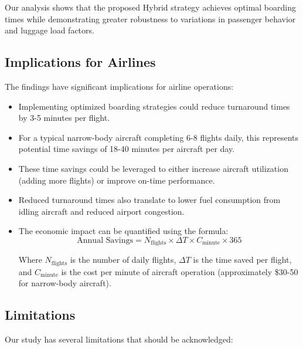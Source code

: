 \documentclass[12pt]{article}
\begin{document}
Our analysis shows that the proposed Hybrid strategy achieves optimal boarding times while demonstrating greater robustness to variations in passenger behavior and luggage load factors.

\subsection{Implications for Airlines}

The findings have significant implications for airline operations:

\begin{itemize}
    \item Implementing optimized boarding strategies could reduce turnaround times by 3-5 minutes per flight.
    
    \item For a typical narrow-body aircraft completing 6-8 flights daily, this represents potential time savings of 18-40 minutes per aircraft per day.
    
    \item These time savings could be leveraged to either increase aircraft utilization (adding more flights) or improve on-time performance.
    
    \item Reduced turnaround times also translate to lower fuel consumption from idling aircraft and reduced airport congestion.
    
    \item The economic impact can be quantified using the formula:
    \begin{equation}
        \text{Annual Savings} = N_{\text{flights}} \times \Delta T \times C_{\text{minute}} \times 365
    \end{equation}
    
    Where $N_{\text{flights}}$ is the number of daily flights, $\Delta T$ is the time saved per flight, and $C_{\text{minute}}$ is the cost per minute of aircraft operation (approximately \$30-50 for narrow-body aircraft).
\end{itemize}

\subsection{Limitations}

Our study has several limitations that should be acknowledged:
\end{document}
